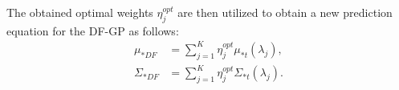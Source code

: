 The obtained optimal weights $\eta^{opt}_j$ are then utilized to obtain a new prediction equation for the \ac{DF-GP} as follows: 
\begin{align} 
	\mu_{*DF} &= \displaystyle\sum_{j=1}^{K} \eta^{opt}_j \mu_{*t}(\lambda_j) , \label{eq:pred_dfgp1}\\
	\Sigma_{*DF} &=  \displaystyle\sum_{j=1}^{K} \eta^{opt}_j \Sigma_{*t}(\lambda_j). \label{eq:pred_dfgp2}
\end{align}









